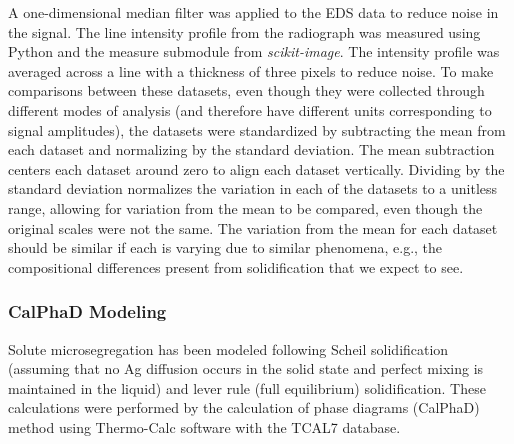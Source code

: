 A one-dimensional median filter was applied to the EDS data to reduce
noise in the signal. The line intensity profile from the radiograph was
measured using Python and the measure submodule from \textit{scikit-image}.
The intensity profile was averaged across a line with a thickness of three
pixels to reduce noise. To make comparisons between these datasets, even
though they were collected through different modes of analysis (and
therefore have different units corresponding to signal amplitudes), the
datasets were standardized by subtracting the mean from each dataset and
normalizing by the standard deviation. The mean subtraction centers each
dataset around zero to align each dataset vertically. Dividing by the
standard deviation normalizes the variation in each of the datasets to a
unitless range, allowing for variation from the mean to be compared, even
though the original scales were not the same. The variation from the mean
for each dataset should be similar if each is varying due to similar
phenomena, e.g., the compositional differences present from solidification
that we expect to see.

\subsubsection{CalPhaD Modeling}
Solute microsegregation has been modeled following Scheil solidification
(assuming that no Ag diffusion occurs in the solid state and perfect
mixing is maintained in the liquid) \cite{Scheil1942} and lever rule
(full equilibrium)
solidification. These calculations were performed by the calculation of
phase diagrams (CalPhaD) method using Thermo-Calc software with the TCAL7
database.

